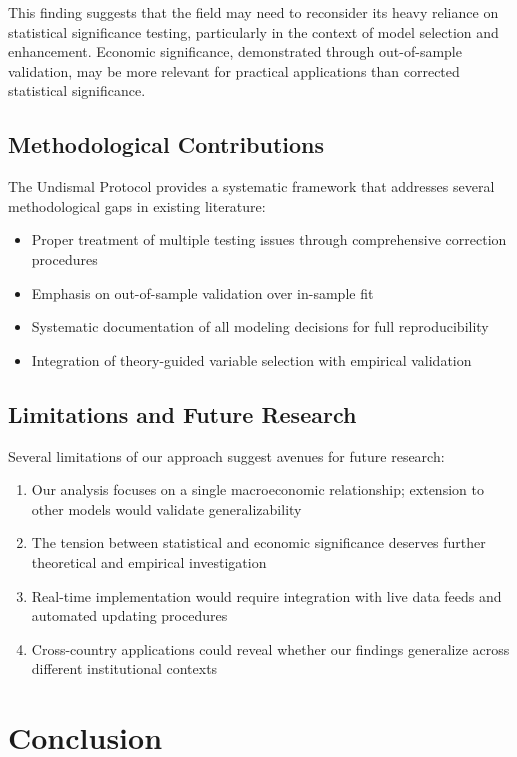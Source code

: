 \documentclass[12pt]{article}
\begin{document}
This finding suggests that the field may need to reconsider its heavy reliance on statistical significance testing, particularly in the context of model selection and enhancement. Economic significance, demonstrated through out-of-sample validation, may be more relevant for practical applications than corrected statistical significance.

\subsection{Methodological Contributions}

The Undismal Protocol provides a systematic framework that addresses several methodological gaps in existing literature:

\begin{itemize}
\item Proper treatment of multiple testing issues through comprehensive correction procedures
\item Emphasis on out-of-sample validation over in-sample fit
\item Systematic documentation of all modeling decisions for full reproducibility
\item Integration of theory-guided variable selection with empirical validation
\end{itemize}

\subsection{Limitations and Future Research}

Several limitations of our approach suggest avenues for future research:

\begin{enumerate}
\item Our analysis focuses on a single macroeconomic relationship; extension to other models would validate generalizability
\item The tension between statistical and economic significance deserves further theoretical and empirical investigation
\item Real-time implementation would require integration with live data feeds and automated updating procedures
\item Cross-country applications could reveal whether our findings generalize across different institutional contexts
\end{enumerate}

\section{Conclusion}
\end{document}
